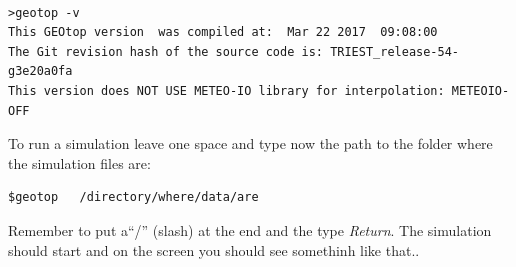 \footnotesize{
\begin{verbatim}

>geotop -v
This GEOtop version  was compiled at:  Mar 22 2017  09:08:00
The Git revision hash of the source code is: TRIEST_release-54-g3e20a0fa
This version does NOT USE METEO-IO library for interpolation: METEOIO-OFF

\end{verbatim}
}


\noindent  To run a simulation  leave one space and type now the path to the folder where the simulation files are:

\footnotesize{
\begin{verbatim}
$geotop   /directory/where/data/are
\end{verbatim}
}

\noindent Remember to put a``/'' (slash) at the end and the type {\it Return}. The simulation should start and on the screen you should see somethinh like that..




